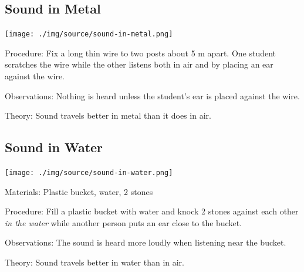 \begin{multicols}{2}
\subsection{Sound in Metal}

\begin{center}
\texttt{[image: ./img/source/sound-in-metal.png]}
\end{center}

\begin{description*}
\item[Procedure:]{Fix a long thin wire to two posts about 5 m apart. One student scratches the wire while the other listens both in air and by placing an ear against the wire.}
\item[Observations:]{Nothing is heard unless the student's ear is placed against the wire.}
\item[Theory:]{Sound travels better in metal than it does in air.}
\end{description*}

\subsection{Sound in Water}

\begin{center}
\texttt{[image: ./img/source/sound-in-water.png]}
\end{center}

\begin{description*}
\item[Materials:]{Plastic bucket, water, 2 stones}
\item[Procedure:]{Fill a plastic bucket with water and knock 2 stones against each other \emph{in the water} while another person puts an ear close to the bucket.}
\item[Observations:]{The sound is heard more loudly when listening near the bucket.}
\item[Theory:]{Sound travels better in water than in air.}
\end{description*}


\end{multicols}
